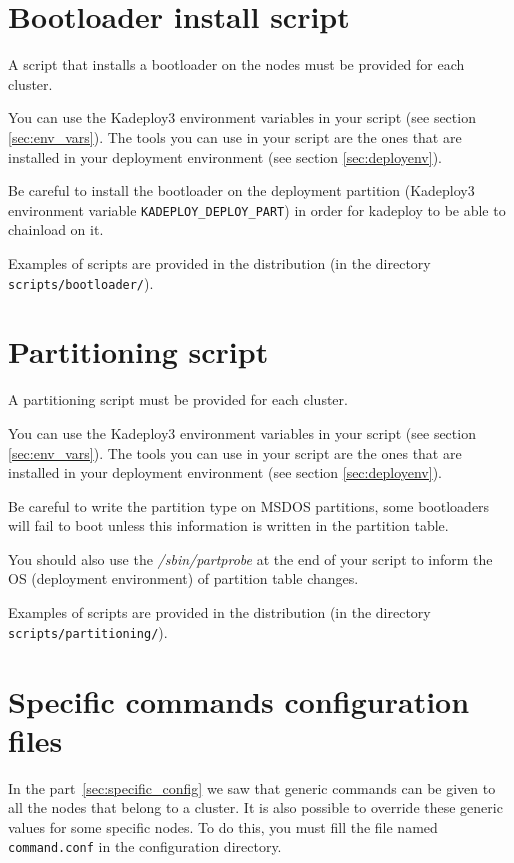 \documentclass[a4wide,10pt,oneside]{book}
\begin{document}
\section{Bootloader install script}\label{sec:bootscript}
A script that installs a bootloader on the nodes must be provided for each cluster.

You can use the Kadeploy3 environment variables in your script (see section \ref{sec:env_vars}). The tools you can use in your script are the ones that are installed in your deployment environment (see section \ref{sec:deployenv}).

Be careful to install the bootloader on the deployment partition (Kadeploy3 environment variable \texttt{KADEPLOY\_DEPLOY\_PART}) in order for kadeploy to be able to chainload on it.

Examples of scripts are provided in the distribution (in the directory \texttt{scripts/bootloader/}).

\section{Partitioning script}\label{sec:partscript}
A partitioning script must be provided for each cluster.

You can use the Kadeploy3 environment variables in your script (see section \ref{sec:env_vars}). The tools you can use in your script are the ones that are installed in your deployment environment (see section \ref{sec:deployenv}).

Be careful to write the partition type on MSDOS partitions, some bootloaders will fail to boot unless this information is written in the partition table.

You should also use the \emph{/sbin/partprobe} at the end of your script to inform the OS (deployment environment) of partition table changes.

Examples of scripts are provided in the distribution (in the directory \texttt{scripts/partitioning/}).

\section{Specific commands configuration files}
In the part~\ref{sec:specific_config} we saw that generic commands can be given to all the nodes that belong to a cluster. It is also possible to override these generic values for some specific nodes. To do this, you must fill the file named \texttt{command.conf} in the configuration directory.
\end{document}
